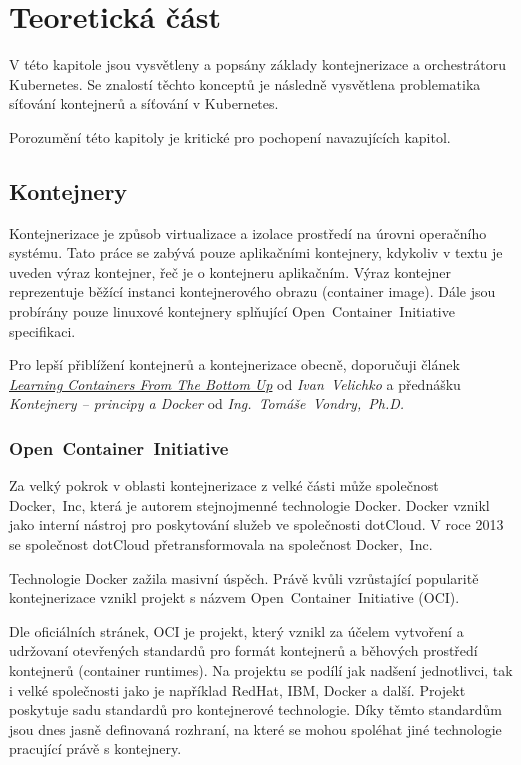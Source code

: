 \chapter{Teoretická část}
\begin{chapterabstract}
V této kapitole jsou vysvětleny a popsány základy kontejnerizace a orchestrátoru Kubernetes. Se znalostí těchto konceptů je následně vysvětlena problematika síťování kontejnerů a síťování v Kubernetes.  

Porozumění této kapitoly je kritické pro pochopení navazujících kapitol.
\end{chapterabstract}

\section{Kontejnery}
Kontejnerizace je způsob virtualizace a izolace prostředí na úrovni operačního systému. Tato práce se zabývá pouze aplikačními kontejnery, kdykoliv v textu je uveden výraz kontejner, řeč je o kontejneru aplikačním. Výraz kontejner reprezentuje běžící instanci kontejnerového obrazu (container image). Dále jsou probírány pouze linuxové kontejnery splňující Open~Container~Initiative specifikaci.

Pro lepší přiblížení kontejnerů a kontejnerizace obecně, doporučuji článek \href{https://iximiuz.com/en/posts/container-learning-path/}{\textit{Learning Containers From The Bottom Up}} \cite{velichko_2021_learning} od \textit{Ivan~Velichko} a přednášku \textit{Kontejnery -- principy a Docker} od \textit{Ing.~Tomáše~Vondry,~Ph.D.} \cite{vondra_2022_kontejnery}

\subsection{Open~Container~Initiative}
Za velký pokrok v oblasti kontejnerizace z velké části může společnost Docker,~Inc, která je autorem stejnojmenné technologie Docker. Docker vznikl jako interní nástroj pro poskytování služeb ve společnosti dotCloud. V roce 2013 se společnost dotCloud přetransformovala na společnost Docker,~Inc. \cite{poulton_2020_docker}

Technologie Docker zažila masivní úspěch. Právě kvůli vzrůstající popularitě kontejnerizace vznikl projekt s názvem Open~Container~Initiative (OCI).

Dle oficiálních stránek, OCI je projekt, který vznikl za účelem vytvoření a udržovaní otevřených standardů pro formát kontejnerů a běhových prostředí kontejnerů (container runtimes). Na projektu se podílí jak nadšení jednotlivci, tak i velké společnosti jako je například RedHat, IBM, Docker a další. Projekt poskytuje sadu standardů pro kontejnerové technologie. Díky těmto standardům jsou dnes jasně definovaná rozhraní, na které se mohou spoléhat jiné technologie pracující právě s kontejnery. \cite{thelinuxfoundation_about}

